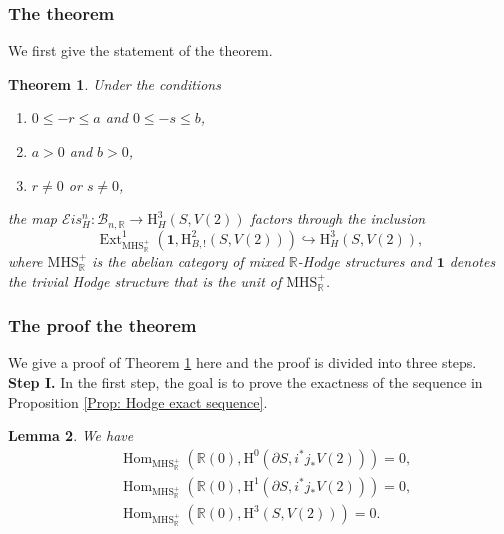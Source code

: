\documentclass[11pt, a4paper]{amsart}
\theoremstyle{plain}
\newtheorem{theorem}{Theorem}[section]
\newtheorem{lemma}[theorem]{Lemma}
\theoremstyle{definition}
\numberwithin{equation}{section}
\def\RR{\mathbb{R}}
\DeclareMathOperator{\Hom}{Hom}
\DeclareMathOperator{\Ext}{Ext}
\begin{document}
\subsubsection{The theorem}
We first give the statement of the theorem. 

\begin{theorem}
\label{Thm: Hdg vanish on the boudary}
Under the conditions
\begin{enumerate}
     \item $0 \le -r \le a$ and  $0 \le -s \le b$, 
     \item $a > 0$ and $b > 0$,
     \item $r \neq 0$ or $s \neq 0$, 
\end{enumerate}
the map $\mathcal{E}is_{H}^n \colon \mathcal{B}_{n,\RR} \rightarrow \mathrm{H}^{3}_{H}(S, V(2))$ factors through the inclusion 
\[
    \Ext^{1}_{\mathrm{MHS}_{\RR}^{+}}(\mathbf{1}, \mathrm{H}^{2}_{B,!}(S, V(2))) \hookrightarrow \mathrm{H}^{3}_{H}(S, V(2)), 
\]
where $\mathrm{MHS}_{\RR}^{+}$ is the abelian category of mixed $\RR$-Hodge structures and ${\mathbf{1}}$ denotes the trivial Hodge structure that is the unit of $\mathrm{MHS}_{\RR}^{+}$. 
\end{theorem}



\subsubsection{The proof the theorem}
We give a proof of Theorem \ref{Thm: Hdg vanish on the boudary} here and the proof is divided into three steps. \\

\noindent \textbf{Step I.} In the first step, the goal is to prove the exactness of the sequence in Proposition \ref{Prop: Hodge exact sequence}. 

\begin{lemma} 
\label{Lemma:``Hom = 0" preparation1.}
    We have 
    \begin{align*}
        & \Hom_{\mathrm{MHS_{\RR}^{+}}}(\RR(0), \mathrm{H}^{0}(\partial S,i^{*}j_{*}V(2))) = 0, \\
        & \Hom_{\mathrm{MHS_{\RR}^{+}}}(\RR(0), \mathrm{H}^{1}(\partial S,i^{*}j_{*}V(2))) = 0, \\
        & \Hom_{\mathrm{MHS_{\RR}^{+}}}(\RR(0), \mathrm{H}^{3}(S,V(2))) = 0. 
    \end{align*}
\end{lemma}
\end{document}
